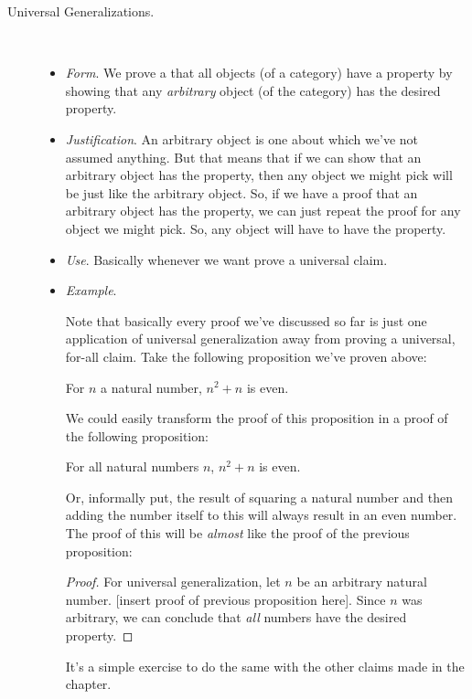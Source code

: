 \begin{enumerate}[{\thesection}.1]
\begin{description}
			\item[Universal Generalizations.] \
			
			
			\begin{itemize}
			
					\item \emph{Form}. 	We prove a that all objects (of a category) have a property by showing that any \emph{arbitrary} object (of the category) has the desired property.
				
					\item \emph{Justification}. An arbitrary object is one about which we've not assumed anything. But that means that if we can show that an arbitrary object has the property, then any object we might pick will be just like the arbitrary object. So, if we have a proof that an arbitrary object has the property, we can just repeat the proof for any object we might pick. So, any object will have to have the property.
										
					\item \emph{Use}. Basically whenever we want prove a universal claim.
					
					\item \emph{Example}.
					
					Note that basically every proof we've discussed so far is just one application of universal generalization away from proving a universal, for-all claim.
					Take the following proposition we've proven above:
					\begin{proposition}
					For $n$ a natural number, $n^2+n$ is even. 
					\end{proposition}
			
					We could easily transform the proof of this proposition in a proof of the following proposition:
					\begin{proposition}
					For all natural numbers $n$, $n^2+n$ is even.
					\end{proposition}
					Or, informally put, the result of squaring a natural number and then adding the number itself to this will always result in an even number. The proof of this will be \emph{almost} like the proof of the previous proposition:
					\begin{proof}
					For universal generalization, let $n$ be an arbitrary natural number. [insert proof of previous proposition here]. Since $n$ was arbitrary, we can conclude that \emph{all} numbers have the desired property.
					\end{proof}		
					It's a simple exercise to do the same with the other claims made in the chapter.
						

\end{itemize}
\end{description}
\end{enumerate}
